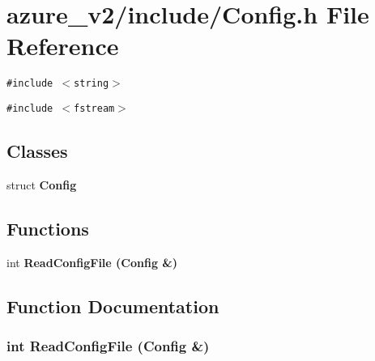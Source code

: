 \section{azure\_\-v2/include/Config.h File Reference}
\label{Config_8h}
{\tt \#include $<$string$>$}\par
{\tt \#include $<$fstream$>$}\par
\subsection*{Classes}
\begin{CompactItemize}
\item 
struct \bf{Config}
\end{CompactItemize}
\subsection*{Functions}
\begin{CompactItemize}
\item 
int \bf{Read\-Config\-File} (\bf{Config} \&)
\end{CompactItemize}


\subsection{Function Documentation}
\subsubsection{\setlength{\rightskip}{0pt plus 5cm}int Read\-Config\-File (\bf{Config} \&)}\label{Config_8h_ef3b1d86a713d6386a70f2f2f87e8e35}


